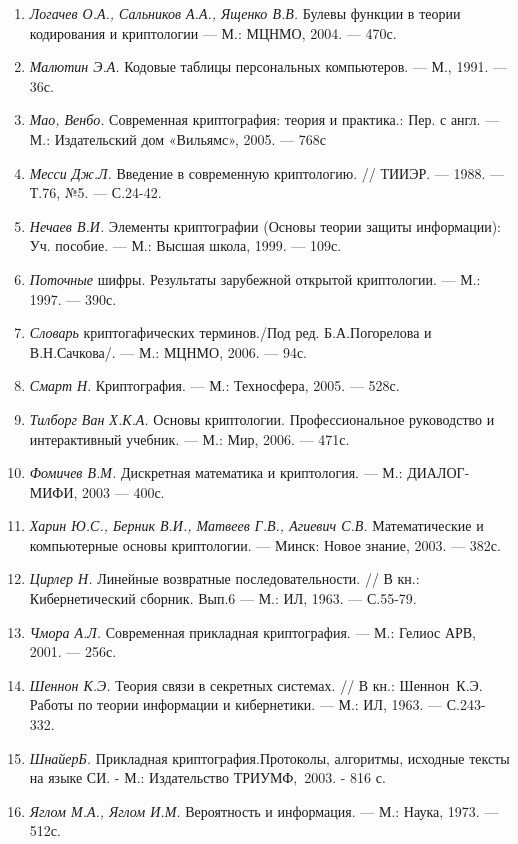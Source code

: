 {{{{{{\begin{enumerate}
\begin{enumerate}
---  Т.1. --- 430с., Т.2 --- 392с.
\item \textit{Логачев О.А., Сальников А.А., Ященко В.В.} Булевы
функции в теории кодирования и криптологии --- М.: МЦНМО, 2004. --- 470с.
\item \textit{Малютин Э.А.} Кодовые таблицы персональных компьютеров.
--- М., 1991. --- 36с.
\item \textit{ Мао, Венбо. }Современная  криптография: теория и практика.: Пер.
с англ. --- М.: Издательский дом «Вильямс»,  2005. --- 768с
\item \textit{Месси Дж.}\textit{Л.} Введение в современную
криптологию. // ТИИЭР. --- 1988. --- Т.76, №5. --- С.24-42.
\item \textit{ Н}\textit{ечаев В.И.} Элементы криптографии (Основы теории защиты
информации):  Уч.  пособие. --- М.: Высшая школа, 1999. --- 109с.
\item \textit{Поточные} шифры. Результаты зарубежной открытой
криптологии. --- М.: 1997. ---  390с. 
\item \textit{Словарь} криптогафических терминов./Под ред. Б.А.Погорелова и
В.Н.Сачкова/. --- М.: МЦНМО, 2006. --- 94с.
\item \textit{\textcolor[rgb]{0.2,0.2,0.2}{Смарт
Н}}\textcolor[rgb]{0.2,0.2,0.2}{. Криптография. }---
\textcolor[rgb]{0.2,0.2,0.2}{ М.: Техносфера, 2005. }---
\textcolor[rgb]{0.2,0.2,0.2}{ 528с.}
\item \textit{Тилборг Ван Х.К.А.} Основы криптологии. Профессиональное
руководство и интерактивный учебник. ---  М.: Мир, 2006. --- 471с.
\item \textit{Фомичев В.М.} Дискретная математика и криптология. --- М.:
ДИАЛОГ-МИФИ, 2003 --- 400с.
\item \textit{Харин Ю.С., Берник В.И., Матвеев Г.В., Агиевич С.В.
}Математические и компьютерные основы криптологии. --- Минск: Новое знание, 2003.
--- 382с.
\item \textit{Цирлер Н.} Линейные возвратные последовательности. // В кн.:
Кибернетический сборник. Вып.6 --- М.: ИЛ, 1963. --- С.55-79.
\item \textit{Чмора А.Л.} Современная прикладная криптография. ---  М.: Гелиос
АРВ,  2001. --- 256с.
\item \textit{Шеннон К.Э.} Теория связи в секретных системах. // В кн.:
Шеннон~К.Э. Работы по теории информации и кибернетики. --- М.: ИЛ, 1963. ---
С.243-332.
\item {\color[rgb]{0.2,0.2,0.2}
\textit{ШнайерБ. }Прикладная криптография.Протоколы, алгоритмы,\newline
исходные тексты на языке СИ. - М.: Издательство ТРИУМФ,~2003. - 816 с\textsf{.}}
\item \textit{Яглом М.А., Яглом И.М.} Вероятность и информация. --- М.: Наука,
1973. --- 512с. 
\end{enumerate}
\end{enumerate}

}}}}}}
